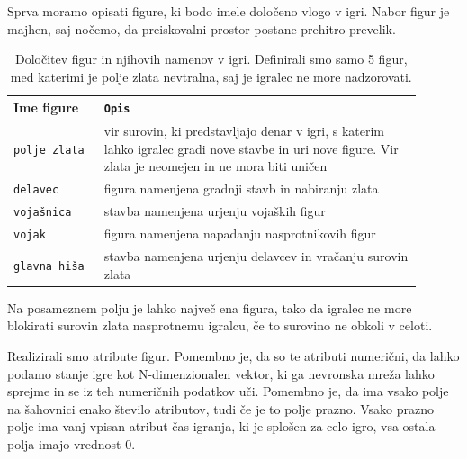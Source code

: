 \documentclass[a4paper, 12pt]{book}
\begin{document}
Sprva moramo opisati figure, ki bodo imele določeno vlogo v igri. Nabor figur je majhen, saj nočemo, da preiskovalni prostor postane prehitro prevelik.

\begin{table}
	\begin{center}
		\begin{tabular}{p{0.2\linewidth}|p{0.7\linewidth}}
			Ime figure        & {\tt Opis} \\ \hline
			{\tt polje zlata} & vir surovin, ki predstavljajo denar v igri, s katerim lahko igralec gradi nove stavbe in uri nove figure. 
								Vir zlata je neomejen in ne mora biti uničen \\
			{\tt delavec}     & figura namenjena gradnji stavb in nabiranju zlata \\
			{\tt vojašnica}   & stavba namenjena urjenju vojaških figur \\
			{\tt vojak}       & figura namenjena napadanju nasprotnikovih figur \\
			{\tt glavna hiša} & stavba namenjena urjenju delavcev in vračanju surovin zlata \\
		\end{tabular}
	\end{center}
	\caption{Določitev figur in njihovih namenov v igri. Definirali smo samo 5 figur, med katerimi je polje zlata nevtralna, saj je igralec ne more nadzorovati. }
	\label{tableFiguresDescription}
\end{table}

Na posameznem polju je lahko največ ena figura, tako da igralec ne more blokirati surovin zlata nasprotnemu igralcu, če to surovino ne obkoli v celoti.

Realizirali smo atribute figur. 
Pomembno je, da so te atributi numerični, da lahko podamo stanje igre kot N-dimenzionalen vektor, ki ga nevronska mreža lahko sprejme in se iz teh numeričnih podatkov uči.
Pomembno je, da ima vsako polje na šahovnici enako število atributov, tudi če je to polje prazno.
Vsako prazno polje ima vanj vpisan atribut čas igranja, ki je splošen za celo igro, vsa ostala polja imajo vrednost 0.
\end{document}
